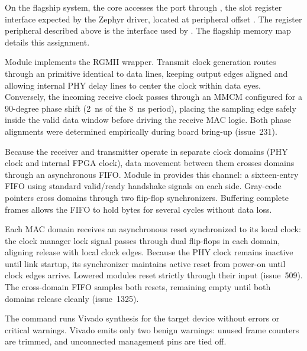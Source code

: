 \documentclass[journal,9pt]{IEEEtran}
\begin{document}
On the flagship system, the core accesses the port through ,
the slot register interface expected by the Zephyr driver, located at
peripheral offset . The register peripheral
 described above is the interface used by .
The flagship memory map details this assignment.

Module  implements the RGMII wrapper. Transmit clock
generation routes through an  primitive identical to data lines,
keeping output edges aligned and allowing internal PHY delay lines to
center the clock within data eyes. Conversely, the incoming receive clock
passes through an MMCM configured for a 90-degree phase shift (2~ns of the
8~ns period), placing the sampling edge safely inside the valid data
window before driving the receive MAC logic. Both phase alignments were
determined empirically during board bring-up (issue~231).



Because the receiver and transmitter operate in separate clock domains
(PHY clock and internal FPGA clock), data movement between them crosses
domains through an asynchronous FIFO. Module  in
 provides this channel: a sixteen-entry FIFO using
standard valid/ready handshake signals on each side. Gray-code pointers
cross domains through two flip-flop synchronizers. Buffering complete
frames allows the FIFO to hold bytes for several cycles without data loss.

Each MAC domain receives an asynchronous reset synchronized to its local
clock: the clock manager lock signal passes through dual flip-flops in each
domain, aligning release with local clock edges. Because the PHY clock
remains inactive until link startup, its synchronizer maintains active reset
from power-on until clock edges arrive. Lowered modules reset strictly
through their  input (issue~509). The cross-domain FIFO samples
both resets, remaining empty until both domains release cleanly
(issue~1325).





The command  runs Vivado synthesis
for the target device without errors or critical warnings. Vivado emits
only two benign warnings: unused frame counters are trimmed, and
unconnected management pins are tied off.
\end{document}
